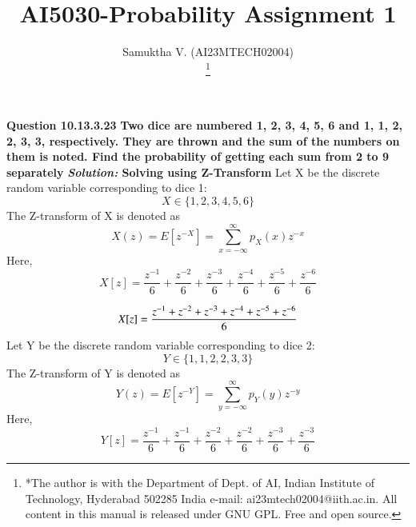 \documentclass[journal,12pt,twocolumn]{IEEEtran}
\begin{document}
\vspace{3cm}

\title{
AI5030-Probability Assignment 1
}
\author{ Samuktha V. (AI23MTECH02004)

	\thanks{*The author is with the Department
		of Dept. of AI, Indian Institute of Technology, Hyderabad
		502285 India e-mail:  ai23mtech02004@iith.ac.in. All content in this manual is released under GNU GPL.  Free and open source.}
}

\maketitle

\newpage


\textbf{Question 10.13.3.23 }
\newline
\textbf{Two dice are numbered 1, 2, 3, 4, 5, 6 and 1, 1, 2, 2, 3, 3, respectively. They are
thrown and the sum of the numbers on them is noted. Find the probability of getting
each sum from 2 to 9 separately }
\newline
\newline
\textbf{\emph{Solution:} Solving using Z-Transform}
\newline
\newline
{ Let X be the discrete random variable corresponding to dice 1: \[ X \in \{1,2,3,4,5,6\} \]}
The Z-transform of X is denoted as \[X(z)=E[z^{-X}]=\sum_{x=-\infty}^{\infty} p_X(x) z^{-x}\]
\newline
Here,
\[X[z] = \frac{z^{-1}}{6} + \frac{z^{-2}}{6} + \frac{z^{-3}}{6} + \frac{z^{-4}}{6} + \frac{z^{-5}}{6} + \frac{z^{-6}}{6}  \]

\begin{equation}
\boldmath{X[z]=\frac{z^{-1}+z^{-2}+z^{-3}+ z^{-4}+ z^{-5} + z^{-6}}{6}}
\end{equation}
\newline
{ Let Y be the discrete random variable corresponding to dice 2: \[ Y \in \{1,1,2,2,3,3\} \]}
The Z-transform of Y is denoted as \[Y(z)=E[z^{-Y}]=\sum_{y=-\infty}^{\infty} p_Y(y) z^{-y}\]
\newline
Here,
\[Y[z] = \frac{z^{-1}}{6} + \frac{z^{-1}}{6} + \frac{z^{-2}}{6} + \frac{z^{-2}}{6} + \frac{z^{-3}}{6} + \frac{z^{-3}}{6}  \]
\end{document}
